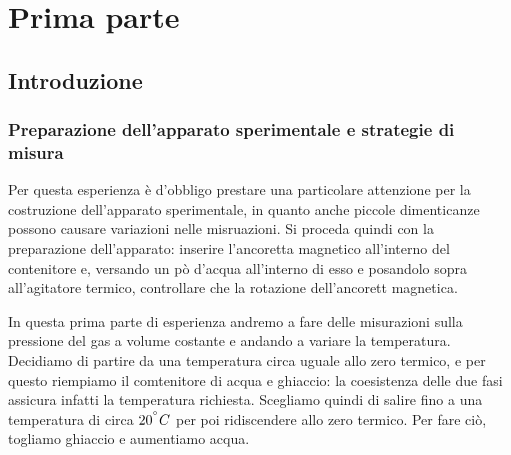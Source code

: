 \section{Prima parte}
\subsection{Introduzione}
\subsubsection{Preparazione dell'apparato sperimentale e strategie di misura}
Per questa esperienza è d'obbligo prestare una particolare attenzione per la costruzione dell'apparato sperimentale, in quanto anche piccole dimenticanze possono causare variazioni nelle misruazioni.
Si proceda quindi con la preparazione dell'apparato: inserire l'ancoretta magnetico all'interno del contenitore e, versando un pò d'acqua all'interno di esso e posandolo sopra all'agitatore termico, controllare che la rotazione dell'ancorett magnetica.

In questa prima parte di esperienza andremo a fare delle misurazioni sulla pressione del gas a volume costante e andando a variare la temperatura.
Decidiamo di partire da una temperatura circa uguale allo zero termico, e per questo riempiamo il comtenitore di acqua e ghiaccio: la coesistenza delle due fasi assicura infatti la temperatura richiesta.
Scegliamo quindi di salire fino a una temperatura di circa $20^{\degree} C$ per poi ridiscendere allo zero termico.
Per fare ciò, togliamo ghiaccio e aumentiamo acqua.
